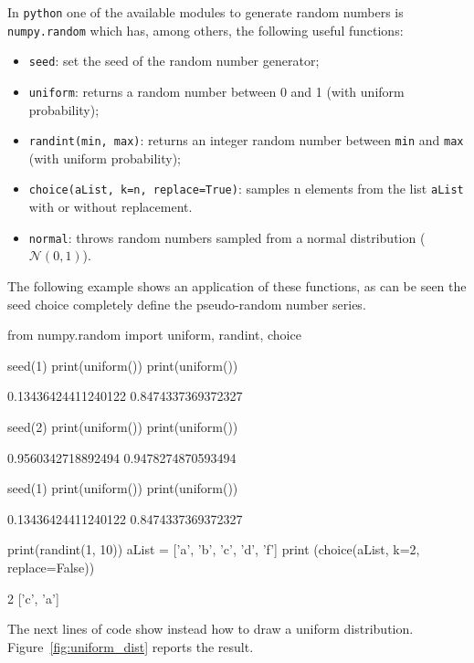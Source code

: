 In \texttt{python} one of the available modules to generate random numbers is \texttt{numpy.random} which has, among others, the following useful functions:
\begin{itemize}
\tightlist
\item \texttt{seed}: set the seed of the random number generator;
\item \texttt{uniform}: returns a random number between 0 and 1 (with uniform probability);
\item \texttt{randint(min,\ max)}: returns an integer random number between \texttt{min} and \texttt{max} (with uniform probability);
\item \texttt{choice(aList,\ k=n, replace=True)}: samples n elements from the list \texttt{aList} with or without replacement.
\item \texttt{normal}: throws random numbers sampled from a normal distribution ($\mathcal{N}(0, 1)$).
\end{itemize}

The following example shows an application of these functions, as can be seen the seed choice completely define the pseudo-random number series.

\begin{ipython}
from numpy.random import uniform, randint, choice

seed(1)
print(uniform())
print(uniform())
\end{ipython}
\begin{ioutput}
0.13436424411240122
0.8474337369372327
\end{ioutput}
\begin{ipython}
seed(2)
print(uniform())
print(uniform())
\end{ipython}
\begin{ioutput}
0.9560342718892494
0.9478274870593494
\end{ioutput}
\begin{ipython}
seed(1)
print(uniform())
print(uniform())
\end{ipython}
\begin{ioutput}
0.13436424411240122
0.8474337369372327
\end{ioutput}
\begin{ipython}
print(randint(1, 10))
aList = ['a', 'b', 'c', 'd', 'f']
print (choice(aList, k=2, replace=False))
\end{ipython}
\begin{ioutput}
2
['c', 'a']
\end{ioutput}

The next lines of code show instead how to draw a uniform distribution. Figure~\ref{fig:uniform_dist} reports the result.

